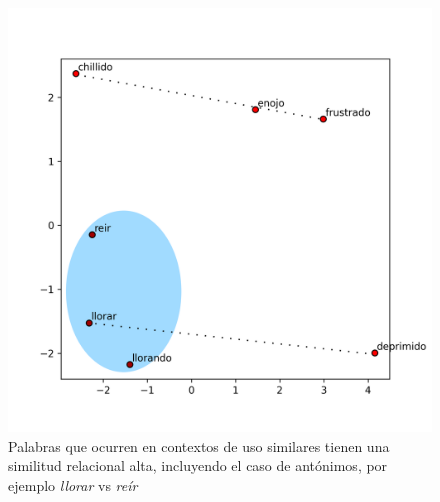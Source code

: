 \begin{figure}[!hbt]
\centering
\includegraphics[width=0.7 \textwidth]{sections/figures/analogia.png}
\caption{Palabras que ocurren en contextos de uso similares tienen una similitud relacional alta, incluyendo el caso de antónimos, por ejemplo \textit{llorar} vs \textit{reír} }
\label{fig:analogia}
\end{figure}